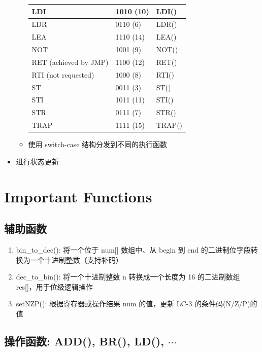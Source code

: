 \documentclass[runningheads]{llncs}
\begin{document}
\begin{itemize}
\begin{itemize}
\begin{table}[H]
\begin{tabular}{|m{5cm}<{\centering}|m{2cm}<{\centering}|m{2cm}<{\centering}|}
                LDI & 1010 (10) & LDI()\\ \hline
                LDR & 0110 (6) & LDR()\\ \hline
                LEA & 1110 (14) & LEA()\\ \hline
                NOT & 1001 (9) & NOT()\\ \hline
                RET (achieved by JMP) & 1100 (12) & RET()\\ \hline
                RTI (not requested)& 1000 (8) & RTI()\\ \hline
                ST & 0011 (3) & ST()\\ \hline
                STI & 1011 (11) & STI()\\ \hline
                STR & 0111 (7) & STR()\\ \hline
                TRAP & 1111 (15) & TRAP()\\ \hline
            \end{tabular}
            \label{tabel.1}
        \end{table}
        \item 使用 switch-case 结构分发到不同的执行函数
    \end{itemize}
    \item 进行状态更新
\end{itemize}
\section{Important Functions}
\subsection{辅助函数}
\begin{enumerate}
    \item bin\_to\_dec(): 将一个位于 num[] 数组中、从 begin 到 end 的二进制位字段转换为一个十进制整数（支持补码）
    \item dec\_to\_bin(): 将一个十进制整数 n 转换成一个长度为 16 的二进制数组 res[]，用于位级逻辑操作
    \item setNZP(): 根据寄存器或操作结果 num 的值，更新 LC-3 的条件码(N/Z/P)的值
\end{enumerate}
\subsection{操作函数: ADD(), BR(), LD(), $\cdots$}
 
\end{document}
